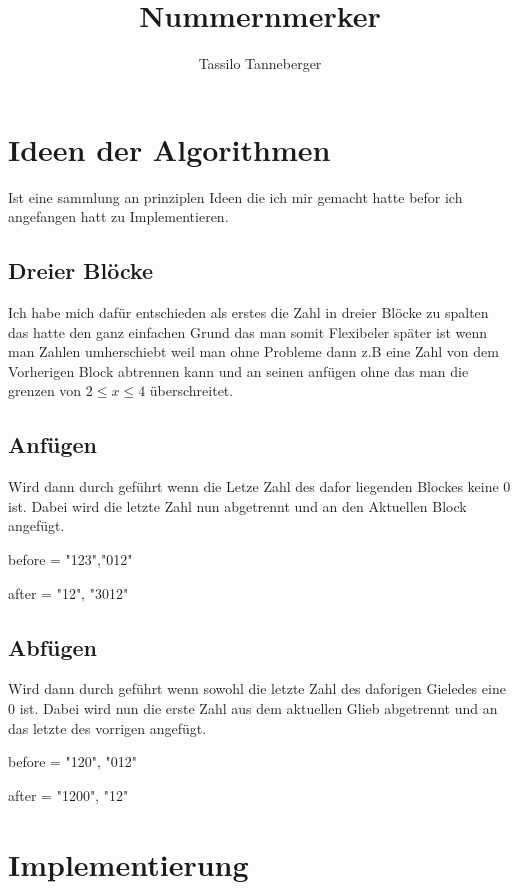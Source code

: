 \documentclass{article}
\begin{document}
\title{Nummernmerker}
\author{Tassilo Tanneberger}

\maketitle

\section{Ideen der Algorithmen}
Ist eine sammlung an prinziplen Ideen die ich mir gemacht hatte befor ich angefangen hatt zu Implementieren.
\subsection{Dreier Blöcke}

Ich habe mich dafür entschieden als erstes die Zahl in dreier Blöcke zu spalten das hatte den ganz einfachen Grund das man somit Flexibeler später ist wenn man Zahlen umherschiebt weil man ohne Probleme dann z.B eine Zahl von dem Vorherigen Block abtrennen kann und an seinen anfügen ohne das man die grenzen von \( 2 \leq x \leq 4  \) überschreitet.

\subsection{Anfügen}

Wird dann durch geführt wenn die Letze Zahl des dafor liegenden Blockes keine 0 ist. Dabei wird die letzte Zahl  nun abgetrennt und an den Aktuellen Block angefügt. \newline

before = "123","012" 

after = "12", "3012"

\subsection{Abfügen}

Wird dann durch geführt wenn sowohl die letzte Zahl des daforigen Gieledes eine 0 ist. Dabei wird nun die erste Zahl aus dem aktuellen Glieb abgetrennt und an das letzte des vorrigen angefügt. \newline

before = "120", "012"

after = "1200", "12"

\section{Implementierung}
\end{document}
